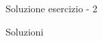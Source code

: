 \begin{frame}{Soluzione esercizio - 2}

    \begin{exampleblock}{Soluzioni}
      
    \end{exampleblock}

\end{frame}
